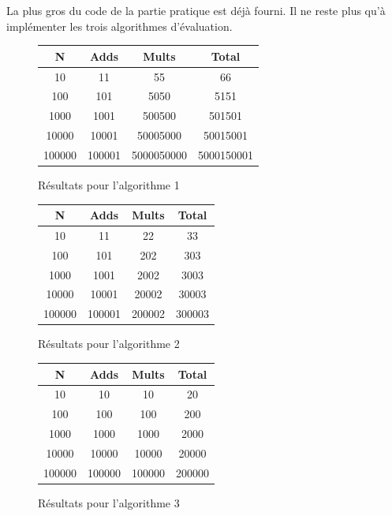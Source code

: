 \documentclass[11pt,a4paper]{article}
\begin{document}
La plus gros du code de la partie pratique est déjà fourni. Il ne reste plus qu'à implémenter les trois algorithmes d'évaluation.

\begin{figure}[h]
\caption{Résultats pour l'algorithme 1}
\centering
\begin{tabular}{ | c | c | c | c | }
	\hline  
	N & Adds & Mults & Total \\
	\hline                       
	10 & 11 & 55 & 66 \\
	100 & 101 & 5050 & 5151 \\
	1000 & 1001 & 500500 & 501501 \\
	10000 & 10001 & 50005000 & 50015001 \\
	100000 & 100001 & 5000050000 & 5000150001 \\
	\hline  
\end{tabular}
\end{figure}

\begin{figure}[h]
\caption{Résultats pour l'algorithme 2}
\centering
\begin{tabular}{ | c | c | c | c | }
	\hline  
	N & Adds & Mults & Total \\
	\hline                       
	10 & 11 & 22 & 33 \\
	100 & 101 & 202 & 303 \\
	1000 & 1001 & 2002 & 3003 \\
	10000 & 10001 & 20002 & 30003 \\
	100000 & 100001 & 200002 & 300003 \\
	\hline  
\end{tabular}
\end{figure}

\begin{figure}
\caption{Résultats pour l'algorithme 3}
\centering
\begin{tabular}{ | c | c | c | c | }
	\hline
	N & Adds & Mults & Total \\
	\hline                       
	10 & 10 & 10 & 20 \\
	100 & 100 & 100 & 200 \\
	1000 & 1000 & 1000 & 2000 \\
	10000 & 10000 & 10000 & 20000 \\
	100000 & 100000 & 100000 & 200000 \\
	\hline  
\end{tabular}
\end{figure}
\end{document}
